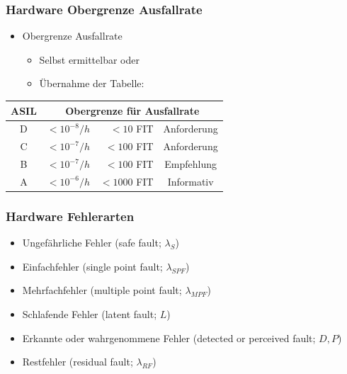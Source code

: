 \documentclass[]{beamer}
\begin{document}
\begin{frame}
\frametitle{Hardware Obergrenze Ausfallrate}

\begin{itemize}
    \item Obergrenze Ausfallrate
    \begin{itemize}
        \item Selbst ermittelbar oder
        \item Übernahme der Tabelle:
    \end{itemize}
\end{itemize}

\begin{center}
\begin{tabular}[h]{c r r c}
\toprule
ASIL & \multicolumn{3}{c}{Obergrenze für Ausfallrate}\\
\midrule
D & $ <10^{-8}/h $ & $ <10 $ FIT & Anforderung\\
C & $ <10^{-7}/h $ & $ <100 $ FIT   & Anforderung\\
B & $ <10^{-7}/h $ & $ <100 $ FIT   & Empfehlung\\
A & $ <10^{-6}/h $ & $ <1000 $ FIT   & Informativ\\
\bottomrule
\end{tabular}
\end{center}

\end{frame}

\begin{frame}
\frametitle{Hardware Fehlerarten}

\begin{itemize}
    \item Ungefährliche Fehler (safe fault; $ \lambda_S $)
    \item Einfachfehler (single point fault; $ \lambda_{SPF} $)
    \item Mehrfachfehler (multiple point fault; $ \lambda_{MPF} $)
    \item Schlafende Fehler (latent fault; $ L $)
    \item Erkannte oder wahrgenommene Fehler (detected or perceived fault; $ D, P $)
    \item Restfehler (residual fault; $ \lambda_{RF} $)
\end{itemize}

\end{frame}
\end{document}
